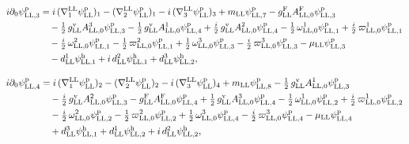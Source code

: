 \documentclass[
  10pt,
]{article}
\begin{document}
\[\begin{aligned}
i\partial_0\psi^{\rm p}_{{\rm LL},3}&=i\,(\nabla^{\rm LL}_1\psi^{\rm p}_{\rm LL})_1-(\nabla^{\rm LL}_2\psi^{\rm p}_{\rm LL})_1-i\,(\nabla^{\rm LL}_3\psi^{\rm p}_{\rm LL})_3+m_{\rm LL}\psi^{\rm p}_{{\rm LL},7}-g^{\rm F}_{\rm LL}A^{\rm F}_{{\rm LL},0}\psi^{\rm p}_{{\rm LL},3}\\
&\quad -\tfrac{1}{2}\,g^{\rm v}_{\rm LL}A^{3}_{{\rm LL},0}\psi^{\rm p}_{{\rm LL},3}-\tfrac{1}{2}\,g^{\rm v}_{\rm LL}A^{1}_{{\rm LL},0}\psi^{\rm p}_{{\rm LL},4}+\tfrac{i}{2}\,g^{\rm v}_{\rm LL}A^{2}_{{\rm LL},0}\psi^{\rm p}_{{\rm LL},4}-\tfrac{1}{2}\,\omega^{1}_{{\rm LL},0}\psi^{\rm p}_{{\rm LL},1}+\tfrac{i}{2}\,\varpi^{1}_{{\rm LL},0}\psi^{\rm p}_{{\rm LL},1}\\
&\quad -\tfrac{i}{2}\,\omega^{2}_{{\rm LL},0}\psi^{\rm p}_{{\rm LL},1}-\tfrac{1}{2}\,\varpi^{2}_{{\rm LL},0}\psi^{\rm p}_{{\rm LL},1}+\tfrac{1}{2}\,\omega^{3}_{{\rm LL},0}\psi^{\rm p}_{{\rm LL},3}-\tfrac{i}{2}\,\varpi^{3}_{{\rm LL},0}\psi^{\rm p}_{{\rm LL},3}-\mu_{\rm LL}\psi^{\rm p}_{{\rm LL},3}\\
&\quad -d^{1}_{\rm LL}\psi^{\rm h}_{{\rm LL},1}+i\,d^{2}_{\rm LL}\psi^{\rm h}_{{\rm LL},1}+d^{3}_{\rm LL}\psi^{\rm h}_{{\rm LL},2},
\end{aligned}\]

\[\begin{aligned}
i\partial_0\psi^{\rm p}_{{\rm LL},4}&=i\,(\nabla^{\rm LL}_1\psi^{\rm p}_{\rm LL})_2-(\nabla^{\rm LL}_2\psi^{\rm p}_{\rm LL})_2-i\,(\nabla^{\rm LL}_3\psi^{\rm p}_{\rm LL})_4+m_{\rm LL}\psi^{\rm p}_{{\rm LL},8}-\tfrac{1}{2}\,g^{\rm v}_{\rm LL}A^{1}_{{\rm LL},0}\psi^{\rm p}_{{\rm LL},3}\\
&\quad -\tfrac{i}{2}\,g^{\rm v}_{\rm LL}A^{2}_{{\rm LL},0}\psi^{\rm p}_{{\rm LL},3}-g^{\rm F}_{\rm LL}A^{\rm F}_{{\rm LL},0}\psi^{\rm p}_{{\rm LL},4}+\tfrac{1}{2}\,g^{\rm v}_{\rm LL}A^{3}_{{\rm LL},0}\psi^{\rm p}_{{\rm LL},4}-\tfrac{1}{2}\,\omega^{1}_{{\rm LL},0}\psi^{\rm p}_{{\rm LL},2}+\tfrac{i}{2}\,\varpi^{1}_{{\rm LL},0}\psi^{\rm p}_{{\rm LL},2}\\
&\quad -\tfrac{i}{2}\,\omega^{2}_{{\rm LL},0}\psi^{\rm p}_{{\rm LL},2}-\tfrac{1}{2}\,\varpi^{2}_{{\rm LL},0}\psi^{\rm p}_{{\rm LL},2}+\tfrac{1}{2}\,\omega^{3}_{{\rm LL},0}\psi^{\rm p}_{{\rm LL},4}-\tfrac{i}{2}\,\varpi^{3}_{{\rm LL},0}\psi^{\rm p}_{{\rm LL},4}-\mu_{\rm LL}\psi^{\rm p}_{{\rm LL},4}\\
&\quad +d^{3}_{\rm LL}\psi^{\rm h}_{{\rm LL},1}+d^{1}_{\rm LL}\psi^{\rm h}_{{\rm LL},2}+i\,d^{2}_{\rm LL}\psi^{\rm h}_{{\rm LL},2},
\end{aligned}\]
\end{document}
